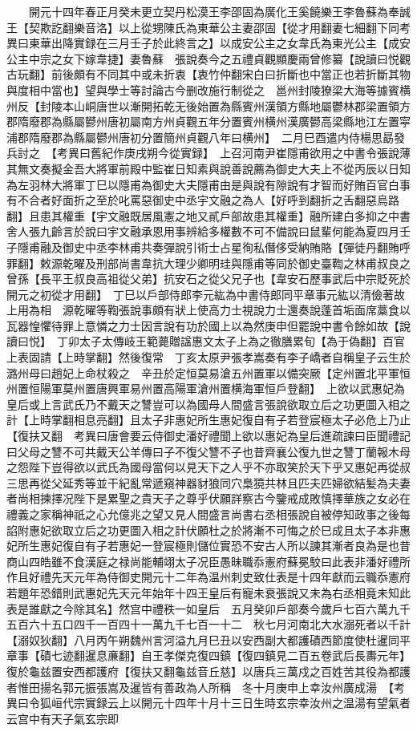 　　開元十四年春正月癸未更立契丹松漠王李邵固為廣化王奚饒樂王李魯蘇為奉誠王【契欺訖翻樂音洛】以上從甥陳氏為東華公主妻邵固【從才用翻妻七細翻下同考異曰東華出降實録在三月壬子於此終言之】以成安公主之女韋氏為東光公主【成安公主中宗之女下嫁韋捷】妻魯蘇　張說奏今之五禮貞觀顯慶兩曾修纂【說讀曰悦觀古玩翻】前後頗有不同其中或未折衷【衷竹仲翻宋白曰折斷也中當正也若折斷其物與度相中當也】望與學士等討論古今删改施行制從之　邕州封陵獠梁大海等據賓横州反【封陵本山峒唐世以漸開拓乾无後始置為縣賓州漢領方縣地屬鬱林郡梁置領方郡隋廢郡為縣屬鬰州唐初屬南方州貞觀五年分置賓州横州漢廣鬰高梁縣地江左置寜浦郡隋廢郡為縣屬鬰州唐初分置簡州貞觀八年曰横州】　二月巳酉遣内侍楊思勗發兵討之　【考異曰舊紀作庚戌朔今從實録】　上召河南尹崔隱甫欲用之中書令張說薄其無文奏擬金吾大將軍前殿中監崔日知素與說善說薦為御史大夫上不從丙辰以日知為左羽林大將軍丁巳以隱甫為御史大夫隱甫由是與說有隙說有才智而好賄百官白事有不合者好面折之至於叱罵惡御史中丞宇文融之為人【好呼到翻折之舌翻惡烏路翻】且患其權重【宇文融既居風憲之地又貳戶部故患其權重】融所建白多抑之中書舍人張九齡言於說曰宇文融承恩用事辨給多權數不可不備說曰鼠輩何能為夏四月壬子隱甫融及御史中丞李林甫共奏彈說引術士占星徇私僭侈受納賄賂【彈徒丹翻賄呼罪翻】敕源乾曜及刑部尚書韋抗大理少卿明珪與隱甫等同於御史臺鞫之林甫叔良之曾孫【長平王叔良高祖從父弟】抗安石之從父兄子也【韋安石歷事武后中宗貶死於開元之初從才用翻】　丁巳以戶部侍郎李元紘為中書侍郎同平章事元紘以清儉著故上用為相　源乾曜等鞫張說事頗有狀上使高力士視說力士還奏說蓬首垢面席藁食以瓦器惶懼待罪上意憐之力士因言說有功於國上以為然庚申但罷說中書令餘如故【說讀曰悦】　丁卯太子太傳岐王範薨贈諡惠文太子上為之徹膳累旬【為于偽翻】百官上表固請【上時掌翻】然後復常　丁亥太原尹張孝嵩奏有李子嶠者自稱皇子云生於潞州母曰趙妃上命杖殺之　辛丑於定恒莫易滄五州置軍以備突厥【定州置北平軍恒州置恒陽軍莫州置唐興軍易州置高陽軍滄州置横海軍恒戶登翻】　上欲以武惠妃為皇后或上言武氏乃不戴天之讐豈可以為國母人間盛言張說欲取立后之功更圖入相之計【上時掌翻相息亮翻】且太子非惠妃所生惠妃復自有子若登宸極太子必危上乃止【復扶又翻　考異曰唐會要云侍御史潘好禮聞上欲以惠妃為皇后進疏諫曰臣聞禮記曰父母之讐不可共戴天公羊傳曰子不復父讐不子也昔齊襄公復九世之讐丁蘭報木母之怨陛下豈得欲以武氏為國母當何以見天下之人乎不亦取笑於天下乎又惠妃再從叔三思再從父延秀等並干紀亂常遞窺神器豺狼同穴梟獍共林且匹夫匹婦欲結髪為夫妻者尚相揀擇况陛下是累聖之貴天子之尊乎伏願詳察古今鑒戒成敗慎擇華族之女必在禮義之家稱神祇之心允億兆之望又見人間盛言尚書右丞相張說自被停知政事之後每諂附惠妃欲取立后之功更圖入相之計伏願杜之於將漸不可悔之於巳成且太子本非惠妃所生惠妃復自有子若惠妃一登宸極則儲位實恐不安古人所以諫其漸者良為是也昔商山四皓雖不食漢庭之禄尚能輔翊太子况臣愚昧職忝憲府蘇冕駮曰此表非潘好禮所作且好禮先天元年為侍御史開元十二年為温州刺史致仕表是十四年獻而云職忝憲府若題年恐錯則武惠妃先天元年始年十四王皇后有寵未衰張說又未為右丞相竟未知此表是誰獻之今除其名】然宫中禮秩一如皇后　五月癸卯戶部奏今歲戶七百六萬九千五百六十五口四千一百四十一萬九千七百一十二　秋七月河南北大水溺死者以千計【溺奴狄翻】八月丙午朔魏州言河溢九月巳丑以安西副大都護磧西節度使杜暹同平章事【磧七迹翻暹息亷翻】自王孝傑克復四鎮【復四鎮見二百五卷武后長夀元年】復於龜兹置安西都護府【復扶又翻龜兹音丘慈】以唐兵三萬戍之百姓苦其役為都護者惟田揚名郭元振張嵩及暹皆有善政為人所稱　冬十月庚申上幸汝州廣成湯　【考異曰令狐峘代宗實録云上以開元十四年十月十三日生時玄宗幸汝州之温湯有望氣者云宫中有天子氣玄宗即